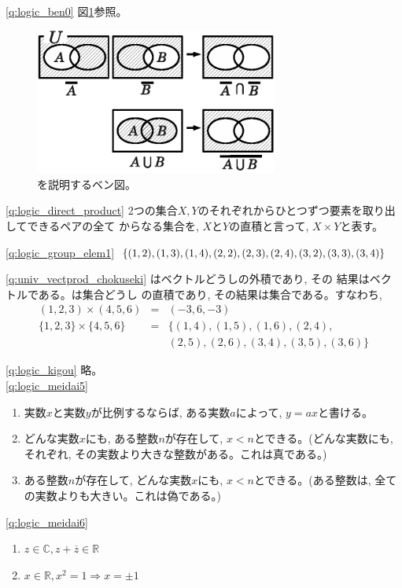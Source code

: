 \ref{q:logic_ben0} 図\ref{fig:ven3}参照。
\begin{figure}[ht]
    \centering
    \includegraphics[width=8cm]{ven3.eps}
    \caption{を説明するベン図。\label{fig:ven3}}
\end{figure}

\ref{q:logic_direct_product} 
2つの集合$X, Y$のそれぞれからひとつずつ要素を取り出してできるペアの全て
からなる集合を, $X$と$Y$の直積と言って, $X\times Y$と表す。
\hv

\ref{q:logic_group_elem1}
 $\{(1, 2), (1, 3), (1, 4), (2, 2), (2, 3), \\(2, 4), (3, 2), (3, 3), (3, 4)\}$
\hv

\ref{q:univ_vectprod_chokuseki}
はベクトルどうしの外積であり, その
結果はベクトルである。は集合どうし
の直積であり, その結果は集合である。すなわち, 
\begin{eqnarray*}
(1, 2, 3)\times(4, 5, 6)&=&(-3, 6, -3)\\
\{1, 2, 3\}\times\{4, 5, 6\}&=&\{(1, 4), (1, 5), (1, 6), (2, 4),\\
&& (2, 5), (2, 6), (3, 4), (3, 5), (3, 6)\}
\end{eqnarray*}
\hv

\ref{q:logic_kigou} 略。\\

\ref{q:logic_meidai5}
\begin{enumerate}
\item 実数$x$と実数$y$が比例するならば, ある実数$a$によって, $y=ax$と書ける。
\item どんな実数$x$にも, ある整数$n$が存在して, $x<n$とできる。(どんな実数にも, それぞれ, その実数より大きな整数がある。これは真である。)
\item ある整数$n$が存在して, どんな実数$x$にも, $x<n$とできる。(ある整数は, 全ての実数よりも大きい。これは偽である。)
\end{enumerate}
\hv

\ref{q:logic_meidai6}
\begin{enumerate}
\item $z \in \mathbb{C}, z+\overline{z}\in\mathbb{R}$
\item $x \in \mathbb{R}, x^2=1 \Longrightarrow x = \pm 1$
\end{enumerate}


